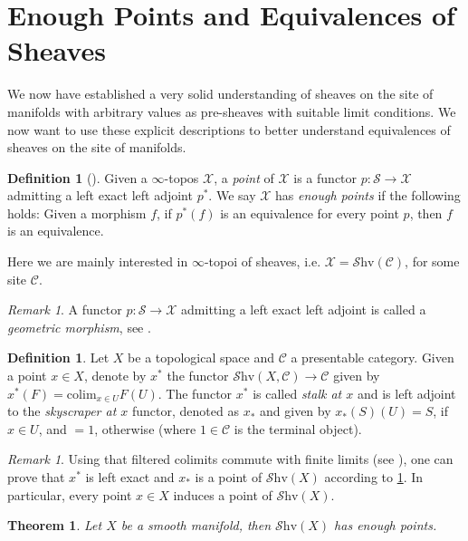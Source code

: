 \documentclass[10pt]{amsart}
\newcommand{\C}{\mathscr{C}}
\newcommand{\s}{\mathscr{S}}
\newcommand{\X}{\mathscr{X}}
\newcommand{\colim}{\mathrm{colim}}
\newcommand{\Shv}{\mathscr{S}\mathrm{hv}}
\newtheorem{theorem}[equation]{Theorem}
\theoremstyle{definition}
\newtheorem{definition}[equation]{Definition}
\theoremstyle{remark}
\newtheorem{remark}[equation]{Remark}
\numberwithin{equation}{section}
\begin{document}
\section{Enough Points and Equivalences of Sheaves}
We now have established a very solid understanding of sheaves on the site of manifolds with arbitrary values as pre-sheaves with suitable limit conditions. We now want to use these explicit descriptions to better understand equivalences of sheaves on the site of manifolds.
\begin{definition}[{\cite[Remark 6.5.4.8]{lurie2009htt}}]\label{def:point}
	Given a $\infty$-topos $\X$, a \emph{point} of $\X$ is a functor $p:\s\to\X$ admitting a left exact left adjoint $p^*$. We say $\X$ has \emph{enough points} if the following holds: Given a morphism $f$, if $p^*(f)$ is an equivalence for every point $p$, then $f$ is an equivalence.
\end{definition}
Here we are mainly interested in $\infty$-topoi of sheaves, i.e. $\X=\Shv(\C)$, for some site $\C$.
\begin{remark}
	A functor $p:\s\to\X$ admitting a left exact left adjoint is called a \emph{geometric morphism}, see \cite[Definition 6.3.1.1]{lurie2009htt}. 
\end{remark}
\begin{definition}\label{def:stalk}
	Let $X$ be a topological space and $\C$ a presentable category. Given a point $x\in X$, denote by $x^*$ the functor $\Shv(X,\C)\to\C$ given by $x^*(F)=\colim_{x\in U}F(U)$. The functor $x^*$ is called 
	\emph{stalk at $x$} and is left adjoint to the \emph{skyscraper at $x$} functor, denoted as $x_*$ and given by $x_*(S)(U)=S$, if $x\in U$, and $=1$, otherwise (where $1\in\C$ is the terminal object).
\end{definition}
\begin{remark}\label{rmk:pointsheaf}
	Using that filtered colimits commute with finite limits (see \cite[Example 7.3.4.7]{lurie2009htt}), one can prove that $x^*$ is left exact and $x_*$ is a point of $\Shv(X)$ according to \cref{def:point}. In particular, every point $x\in X$ induces a point of $\Shv(X)$. 
\end{remark}
\begin{theorem}\label{thm:enougpoints}
	Let $X$ be a smooth manifold, then $\Shv(X)$ has enough points. 
\end{theorem}
\end{document}
